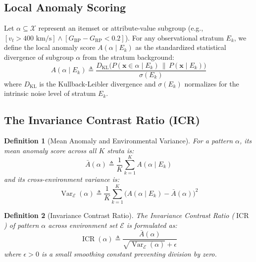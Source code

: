 \documentclass[10pt,a4paper]{article}
\newtheorem{definition}{Definition}
\begin{document}
\subsection{Local Anomaly Scoring}
Let $\alpha \subseteq \mathcal{X}$ represent an itemset or attribute-value subgroup (e.g., $[v_t > 400 \text{ km/s}] \wedge [G_{\text{BP}} - G_{\text{RP}} < 0.2]$).  
For any observational stratum $E_k$, we define the local anomaly score $A(\alpha \mid E_k)$ as the standardized statistical divergence of subgroup $\alpha$ from the stratum background:
\begin{equation}
    A(\alpha \mid E_k) \triangleq \frac{D_{\text{KL}}\big( P(\mathbf{x} \in \alpha \mid E_k) \,\|\, P(\mathbf{x} \mid E_k) \big)}{\sigma(E_k)}
\end{equation}
where $D_{\text{KL}}$ is the Kullback-Leibler divergence and $\sigma(E_k)$ normalizes for the intrinsic noise level of stratum $E_k$.

\subsection{The Invariance Contrast Ratio (ICR)}
\begin{definition}[Mean Anomaly and Environmental Variance]
For a pattern $\alpha$, its mean anomaly score across all $K$ strata is:
\begin{equation}
    \bar{A}(\alpha) \triangleq \frac{1}{K} \sum_{k=1}^K A(\alpha \mid E_k)
\end{equation}
and its cross-environment variance is:
\begin{equation}
    \operatorname{Var}_{\mathcal{E}}(\alpha) \triangleq \frac{1}{K} \sum_{k=1}^K \Big( A(\alpha \mid E_k) - \bar{A}(\alpha) \Big)^2
\end{equation}
\end{definition}

\begin{definition}[Invariance Contrast Ratio]
The Invariance Contrast Ratio ($\operatorname{ICR}$) of pattern $\alpha$ across environment set $\mathcal{E}$ is formulated as:
\begin{equation}
    \operatorname{ICR}(\alpha) \triangleq \frac{\bar{A}(\alpha)}{\sqrt{\operatorname{Var}_{\mathcal{E}}(\alpha)} + \epsilon}
\end{equation}
where $\epsilon > 0$ is a small smoothing constant preventing division by zero.
\end{definition}
\end{document}
